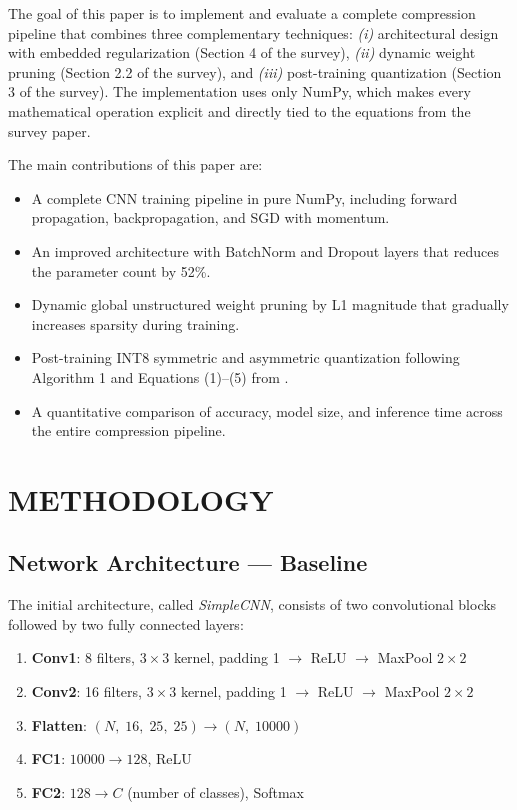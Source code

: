 \documentclass[letterpaper, 10 pt, conference]{ieeeconf}
\begin{document}
The goal of this paper is to implement and evaluate a complete compression pipeline that combines three complementary techniques: \textit{(i)} architectural design with embedded regularization (Section 4 of the survey), \textit{(ii)} dynamic weight pruning (Section 2.2 of the survey), and \textit{(iii)} post-training quantization (Section 3 of the survey).
The implementation uses only NumPy, which makes every mathematical operation explicit and directly tied to the equations from the survey paper.

The main contributions of this paper are:
\begin{itemize}
  \item A complete CNN training pipeline in pure NumPy, including forward propagation, backpropagation, and SGD with momentum.
  \item An improved architecture with BatchNorm and Dropout layers that reduces the parameter count by 52\%.
  \item Dynamic global unstructured weight pruning by L1 magnitude that gradually increases sparsity during training.
  \item Post-training INT8 symmetric and asymmetric quantization following Algorithm 1 and Equations (1)--(5) from \cite{li2023survey}.
  \item A quantitative comparison of accuracy, model size, and inference time across the entire compression pipeline.
\end{itemize}

\section{\textbf{METHODOLOGY}}

\subsection{Network Architecture --- Baseline}

The initial architecture, called \textit{SimpleCNN}, consists of two convolutional blocks followed by two fully connected layers:

\begin{enumerate}
  \item \textbf{Conv1}: 8 filters, $3\times3$ kernel, padding 1 $\rightarrow$ ReLU $\rightarrow$ MaxPool $2\times2$
  \item \textbf{Conv2}: 16 filters, $3\times3$ kernel, padding 1 $\rightarrow$ ReLU $\rightarrow$ MaxPool $2\times2$
  \item \textbf{Flatten}: $(N,\;16,\;25,\;25) \rightarrow (N,\;10000)$
  \item \textbf{FC1}: $10000 \rightarrow 128$, ReLU
  \item \textbf{FC2}: $128 \rightarrow C$ (number of classes), Softmax
\end{enumerate}
\end{document}
